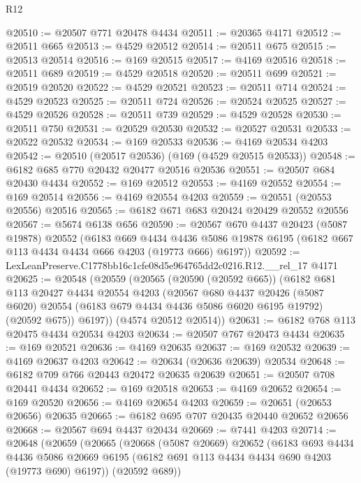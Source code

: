 \begin{lexlean}{R12}
\begin{coremodule}
@20510 := @20507 @771 @20478 @4434
@20511 := @20365 @4171
@20512 := @20511 @665
@20513 := @4529 @20512
@20514 := @20511 @675
@20515 := @20513 @20514
@20516 := @169 @20515
@20517 := @4169 @20516
@20518 := @20511 @689
@20519 := @4529 @20518
@20520 := @20511 @699
@20521 := @20519 @20520
@20522 := @4529 @20521
@20523 := @20511 @714
@20524 := @4529 @20523
@20525 := @20511 @724
@20526 := @20524 @20525
@20527 := @4529 @20526
@20528 := @20511 @739
@20529 := @4529 @20528
@20530 := @20511 @750
@20531 := @20529 @20530
@20532 := @20527 @20531
@20533 := @20522 @20532
@20534 := @169 @20533
@20536 := @4169 @20534 @4203
@20542 := @20510 (@20517 @20536) (@169 (@4529 @20515 @20533))
@20548 := @6182 @685 @770 @20432 @20477 @20516 @20536
@20551 := @20507 @684 @20430 @4434
@20552 := @169 @20512
@20553 := @4169 @20552
@20554 := @169 @20514
@20556 := @4169 @20554 @4203
@20559 := @20551 (@20553 @20556) @20516
@20565 := @6182 @671 @683 @20424 @20429 @20552 @20556
@20567 := @5674 @6138 @656
@20590 := @20567
    @670
    @4437
    @20423
    (@5087 @19878)
    @20552
    (@6183
      @669
      @4434
      @4436
      @5086
      @19878
      @6195
      (@6182 @667 @113 @4434 @4434 @666 @4203 (@19773 @666) @6197))
@20592 := LexLeanPreserve.C1778bb16c1cfe08d5e964765dd2c0216.R12.__rel_17 @4171
@20625 := @20548
    (@20559
      (@20565
        (@20590 (@20592 @665))
        (@6182
          @681
          @113
          @20427
          @4434
          @20554
          @4203
          (@20567
            @680
            @4437
            @20426
            (@5087 @6020)
            @20554
            (@6183 @679 @4434 @4436 @5086 @6020 @6195 @19792)
            (@20592 @675))
          @6197))
      (@4574 @20512 @20514))
@20631 := @6182 @768 @113 @20475 @4434 @20534 @4203
@20634 := @20507 @767 @20473 @4434
@20635 := @169 @20521
@20636 := @4169 @20635
@20637 := @169 @20532
@20639 := @4169 @20637 @4203
@20642 := @20634 (@20636 @20639) @20534
@20648 := @6182 @709 @766 @20443 @20472 @20635 @20639
@20651 := @20507 @708 @20441 @4434
@20652 := @169 @20518
@20653 := @4169 @20652
@20654 := @169 @20520
@20656 := @4169 @20654 @4203
@20659 := @20651 (@20653 @20656) @20635
@20665 := @6182 @695 @707 @20435 @20440 @20652 @20656
@20668 := @20567 @694 @4437 @20434
@20669 := @7441 @4203
@20714 := @20648
    (@20659
      (@20665
        (@20668
          (@5087 @20669)
          @20652
          (@6183
            @693
            @4434
            @4436
            @5086
            @20669
            @6195
            (@6182 @691 @113 @4434 @4434 @690 @4203 (@19773 @690) @6197))
          (@20592 @689))

\end{coremodule}
\end{lexlean}
